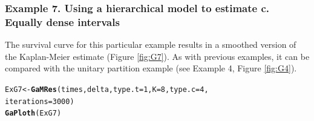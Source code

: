 \documentclass[letterpaper]{article}\usepackage[]{graphicx}\usepackage[]{color}
\makeatletter
\newcommand{\hlnum}[1]{\textcolor[rgb]{0.686,0.059,0.569}{#1}}%
\newcommand{\hlstd}[1]{\textcolor[rgb]{0.345,0.345,0.345}{#1}}%
\newcommand{\hlkwb}[1]{\textcolor[rgb]{0.69,0.353,0.396}{#1}}%
\newcommand{\hlkwc}[1]{\textcolor[rgb]{0.333,0.667,0.333}{#1}}%
\newcommand{\hlkwd}[1]{\textcolor[rgb]{0.737,0.353,0.396}{\textbf{#1}}}%
\newenvironment{kframe}{%
 \def\at@end@of@kframe{}%
 \ifinner\ifhmode%
  \def\at@end@of@kframe{\end{minipage}}%
  \begin{minipage}{\columnwidth}%
 \fi\fi%
 \def\FrameCommand##1{\hskip\@totalleftmargin \hskip-\fboxsep
 \colorbox{shadecolor}{##1}\hskip-\fboxsep
     \hskip-\linewidth \hskip-\@totalleftmargin \hskip\columnwidth}%
 \MakeFramed {\advance\hsize-\width
   \@totalleftmargin\z@ \linewidth\hsize
   \@setminipage}}%
 {\par\unskip\endMakeFramed%
 \at@end@of@kframe}
\newenvironment{knitrout}{}{} %
\makeatother
\begin{document}
\subsubsection{Example 7. Using a hierarchical model to estimate c. Equally dense intervals}

The survival curve for this particular example results in a smoothed version of the Kaplan-Meier estimate (Figure \ref{fig:G7}). As with previous examples, it can be compared with the unitary partition example (see Example 4, Figure \ref{fig:G4}). 

\begin{knitrout}
\color{fgcolor}\begin{kframe}
\begin{alltt}
\hlstd{ExG7} \hlkwb{<-} \hlkwd{GaMRes}\hlstd{(times, delta,} \hlkwc{type.t} \hlstd{=} \hlnum{1}\hlstd{,} \hlkwc{K} \hlstd{=} \hlnum{8}\hlstd{,} \hlkwc{type.c} \hlstd{=} \hlnum{4}\hlstd{,}
               \hlkwc{iterations} \hlstd{=} \hlnum{3000}\hlstd{)}
\hlkwd{GaPloth}\hlstd{(ExG7)}
\end{alltt}
\end{kframe}
\end{knitrout}
\end{document}
